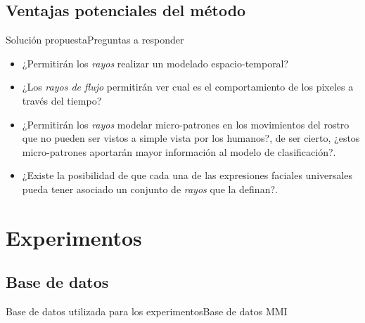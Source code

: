 \documentclass{beamer}
\begin{document}
	\subsection{Ventajas potenciales del método}
		\begin{frame}{Solución propuesta}{Preguntas a responder}
					
					\begin{itemize}
						\item ¿Permitirán los \textit{rayos} realizar un modelado espacio-temporal?
						\item ¿Los \textit{rayos de flujo} permitirán ver cual es el comportamiento de los pixeles a través del tiempo?
						\item ¿Permitirán los \textit{rayos} modelar micro-patrones en los movimientos del rostro que no pueden ser vistos a simple vista por los humanos?, de ser cierto, ¿estos micro-patrones aportarán mayor información al modelo de clasificación?.
						\item ¿Existe la posibilidad de que cada una de las expresiones faciales universales pueda tener asociado un conjunto de \textit{rayos} que la definan?. 
					\end{itemize}
		\end{frame}	

  \section{Experimentos}
  	\subsection{Base de datos}
  	\begin{frame}{Base de datos utilizada para los experimentos}{Base de datos MMI}
  		\begin{center}
  		\end{center}		
  	\end{frame}	
  
  
\end{document}
